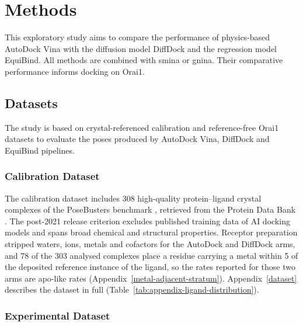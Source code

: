 \hypertarget{methods}{%
\chapter{\texorpdfstring{Methods }{Methods }}\label{methods}}

This exploratory study aims to compare the performance of physics-based AutoDock Vina with the diffusion model DiffDock and the regression model EquiBind. All methods are combined with smina or gnina. Their comparative performance informs docking on Orai1.

\hypertarget{datasets}{%
\section{Datasets}\label{datasets}}

The study is based on crystal-referenced calibration and reference-free Orai1 datasets to evaluate the poses produced by AutoDock Vina, DiffDock and EquiBind pipelines.

\protect\hypertarget{_Toc235735885}{}{}

\hypertarget{calibration-dataset}{%
\subsection{Calibration Dataset}\label{calibration-dataset}}

The calibration dataset includes 308 high-quality protein--ligand crystal complexes of the PoseBusters benchmark \cite{ref035}, retrieved from the Protein Data Bank \cite{ref043}. The post-2021 release criterion excludes published training data of AI docking models and spans broad chemical and structural properties. Receptor preparation stripped waters, ions, metals and cofactors for the AutoDock and DiffDock arms, and 78 of the 303 analysed complexes place a residue carrying a metal within 5\angstrom{} of the deposited reference instance of the ligand, so the rates reported for those two arms are apo-like rates (Appendix~\ref{metal-adjacent-stratum}). Appendix~\ref{dataset} describes the dataset in full (Table~\ref{tab:appendix-ligand-distribution}).

\hypertarget{experimental-dataset}{%
\subsection{Experimental Dataset}\label{experimental-dataset}}

